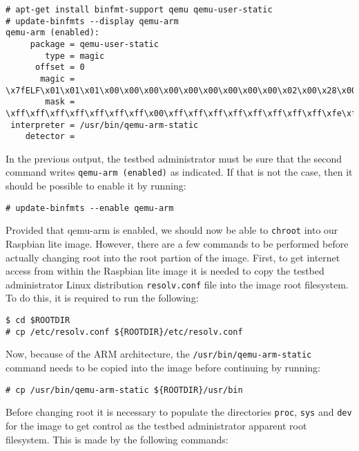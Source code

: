 \begin{lstlisting}[]
# apt-get install binfmt-support qemu qemu-user-static
# update-binfmts --display qemu-arm
qemu-arm (enabled):
     package = qemu-user-static
        type = magic
      offset = 0
       magic = \x7fELF\x01\x01\x01\x00\x00\x00\x00\x00\x00\x00\x00\x00\x02\x00\x28\x00
        mask = \xff\xff\xff\xff\xff\xff\xff\x00\xff\xff\xff\xff\xff\xff\xff\xff\xfe\xff\xff\xff
 interpreter = /usr/bin/qemu-arm-static
    detector =
\end{lstlisting}
\FloatBarrier
\vspace{-5mm}

In the previous output, the testbed administrator must be sure that the second
command writes \texttt{qemu-arm (enabled)} as indicated. If that is not the
case, then it should be possible to enable it by running:

\begin{lstlisting}[]
# update-binfmts --enable qemu-arm
\end{lstlisting}
\FloatBarrier
\vspace{-5mm}

Provided that qemu-arm is enabled, we should now be able to \texttt{chroot}
into our Raspbian lite image. However, there are a few commands to be
performed before actually changing root into the root partion of the image.
First, to get internet access from within the Raspbian lite image it is needed
to copy the testbed administrator Linux distribution \texttt{resolv.conf} file
into the image root filesystem. To do this, it is required to run the
following:

\begin{lstlisting}[]
$ cd $ROOTDIR
# cp /etc/resolv.conf ${ROOTDIR}/etc/resolv.conf
\end{lstlisting}
\FloatBarrier
\vspace{-5mm}

Now, because of the \ac{ARM} architecture, the
\texttt{/usr/bin/qemu-arm-static} command needs to be copied into the
image before continuing by running:

\begin{lstlisting}[]
# cp /usr/bin/qemu-arm-static ${ROOTDIR}/usr/bin
\end{lstlisting}
\FloatBarrier
\vspace{-5mm}

Before changing root it is necessary to populate the directories
\texttt{proc}, \texttt{sys} and \texttt{dev} for the image to get control
as the testbed administrator apparent root filesystem. This is made by the
following commands:

